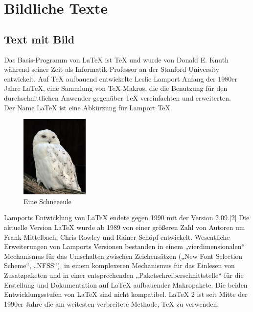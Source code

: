 \documentclass{scrreprt}
\begin{document}
\chapter{Bildliche Texte}
\section{Text mit Bild \cite{ref2}}

Das Basis-Programm von LaTeX ist TeX und wurde von Donald E. Knuth während seiner Zeit als Informatik-Professor an der Stanford University entwickelt. Auf TeX aufbauend entwickelte Leslie Lamport Anfang der 1980er Jahre LaTeX, eine Sammlung von TeX-Makros, die die Benutzung für den durchschnittlichen Anwender gegenüber TeX vereinfachten und erweiterten. 
\\ Der Name LaTeX ist eine Abkürzung für Lamport TeX.
\begin{figure}
\includegraphics[width=0.3\textwidth]{images/396px-Bubo_scandiacus_(Linnaeus,_1758)_Male.jpg}
\caption{Eine Schneeeule \cite{ref3}}
\end{figure}{} 
Lamports Entwicklung von LaTeX endete gegen 1990 mit der Version 2.09.[2] Die aktuelle Version LaTeX wurde ab 1989 von einer größeren Zahl von Autoren um Frank Mittelbach, Chris Rowley und Rainer Schöpf entwickelt. Wesentliche Erweiterungen von Lamports Versionen bestanden in einem „vierdimensionalen“ Mechanismus für das Umschalten zwischen Zeichensätzen („New Font Selection Scheme“, „NFSS“), in einem komplexeren Mechanismus für das Einlesen von Zusatzpaketen und in einer entsprechenden „Paketschreiberschnittstelle“ für die Erstellung und Dokumentation auf LaTeX aufbauender Makropakete. Die beiden Entwicklungsstufen von LaTeX sind nicht kompatibel.
LaTeX 2 ist seit Mitte der 1990er Jahre die am weitesten verbreitete Methode, TeX zu verwenden.\\
\end{document}
